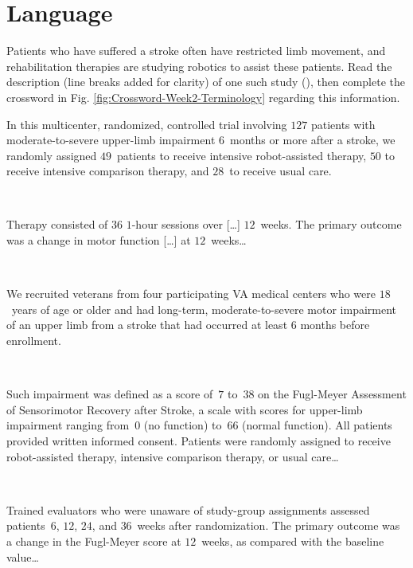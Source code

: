 \documentclass[
  11pt,
  a4paper,
  krantz2]{krantz}
\makeatletter
\renewenvironment{quote}%
{\begin{kframe}}
{\end{kframe}}
\newenvironment{kframe}{%
\medskip{}
\setlength{\fboxsep}{.8em}
 \def\at@end@of@kframe{}%
 \ifinner\ifhmode%
  \def\at@end@of@kframe{\end{minipage}}%
  \begin{minipage}{\columnwidth}%
 \fi\fi%
 \def\FrameCommand##1{\hskip\@totalleftmargin \hskip-\fboxsep
 \colorbox{shadecolor}{##1}\hskip-\fboxsep
     \hskip-\linewidth \hskip-\@totalleftmargin \hskip\columnwidth}%
 \MakeFramed {\advance\hsize-\width
   \@totalleftmargin\z@ \linewidth\hsize
   \@setminipage}}%
 {\par\unskip\endMakeFramed%
 \at@end@of@kframe}
\renewenvironment{quote}
               {\list{}{\vspace{-0.5em}\begin{kframe}\small%
                        \rightmargin   \leftmargin
                        \parsep        \z@ \@plus\p@}%
                \item\relax}
               {\end{kframe}\endlist}
\makeatother
\begin{document}
\section{Language}\label{LanguageReport}

Patients who have suffered a stroke often have restricted limb movement, and rehabilitation therapies are studying robotics to assist these patients.
Read the description (line breaks added for clarity) of one such study (), then complete the crossword
in Fig. \ref{fig:Crossword-Week2-Terminology}
regarding this information.

\begin{quote}
In this multicenter, randomized, controlled trial involving \(127\) patients with moderate-to-severe upper-limb impairment \(6\)~months or more after a stroke, we randomly assigned \(49\)~patients to receive intensive robot-assisted therapy, \(50\) to receive intensive comparison therapy, and \(28\)~to receive usual care.\\
\strut ~

Therapy consisted of \(36\) \(1\)-hour sessions over {[}\ldots{]} \(12\)~weeks.
The primary outcome was a change in motor function {[}\ldots{]} at \(12\)~weeks\ldots{}\\
\strut ~

We recruited veterans from four participating VA medical centers who were \(18\)~years of age or older and had long-term, moderate-to-severe motor impairment of an upper limb from a stroke that had occurred at least \(6\) months before enrollment.\\
\strut ~

Such impairment was defined as a score of~\(7\) to~\(38\) on the Fugl-Meyer Assessment of Sensorimotor Recovery after Stroke, a scale with scores for upper-limb impairment ranging from~\(0\) (no function) to~\(66\) (normal function).
All patients provided written informed consent.
Patients were randomly assigned to receive robot-assisted therapy, intensive comparison therapy, or usual care\ldots{}\\
\strut ~

Trained evaluators who were unaware of study-group assignments assessed patients~\(6\), \(12\), \(24\), and \(36\)~weeks after randomization.
The primary outcome was a change in the Fugl-Meyer score at \(12\)~weeks, as compared with the baseline value\ldots{}
\end{quote}

\pagebreak
\end{document}
